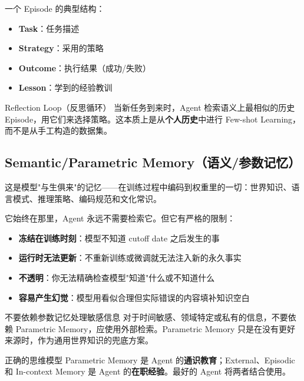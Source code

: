 \documentclass[a4paper]{article}
\begin{document}
一个 Episode 的典型结构：

\begin{itemize}[leftmargin=2em]
    \item \textbf{Task}：任务描述
    \item \textbf{Strategy}：采用的策略
    \item \textbf{Outcome}：执行结果（成功/失败）
    \item \textbf{Lesson}：学到的经验教训
\end{itemize}

\begin{knowledgebox}{Reflection Loop（反思循环）}
当新任务到来时，Agent 检索语义上最相似的历史 Episode，用它们来选择策略。这本质上是从\textbf{个人历史}中进行 Few-shot Learning，而不是从手工构造的数据集。
\end{knowledgebox}

\subsection{Semantic/Parametric Memory（语义/参数记忆）}

这是模型"与生俱来"的记忆——在训练过程中编码到权重里的一切：世界知识、语言模式、推理策略、编码规范和文化常识。

它始终在那里，Agent 永远不需要检索它。但它有严格的限制：

\begin{itemize}[leftmargin=2em]
    \item \textbf{冻结在训练时刻}：模型不知道 cutoff date 之后发生的事
    \item \textbf{运行时无法更新}：不重新训练或微调就无法注入新的永久事实
    \item \textbf{不透明}：你无法精确检查模型"知道"什么或不知道什么
    \item \textbf{容易产生幻觉}：模型用看似合理但实际错误的内容填补知识空白
\end{itemize}

\begin{warningbox}{不要依赖参数记忆处理敏感信息}
对于时间敏感、领域特定或私有的信息，不要依赖 Parametric Memory，应使用外部检索。Parametric Memory 只是在没有更好来源时，作为通用世界知识的兜底方案。
\end{warningbox}

\begin{importantbox}{正确的思维模型}
Parametric Memory 是 Agent 的\textbf{通识教育}；External、Episodic 和 In-context Memory 是 Agent 的\textbf{在职经验}。最好的 Agent 将两者结合使用。
\end{importantbox}
\end{document}
